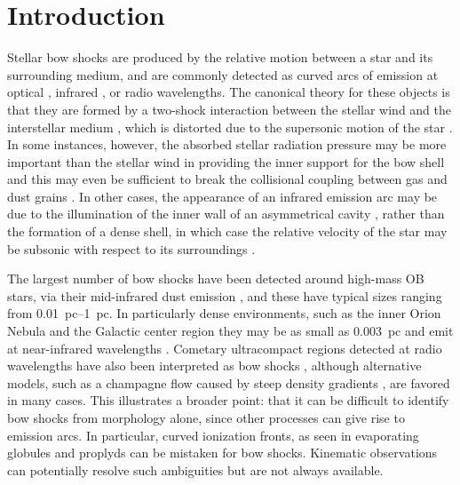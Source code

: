 
\section{Introduction}
\label{sec:introduction}

Stellar bow shocks are produced by the relative motion between a star
and its surrounding medium, and are commonly detected as curved arcs
of emission at optical \citep{Gull:1979a, Brown:2005a}, infrared
\citep{van-Buren:1988a, Kobulnicky:2016a}, or radio
\citep{van-Buren:1990a, Benaglia:2010a} wavelengths.  The canonical
theory for these objects is that they are formed by a two-shock
interaction between the stellar wind and the interstellar medium
\citep{Pikelner:1968a, Dyson:1972a}, which is distorted due to the
supersonic motion of the star \citep{Baranov:1970a, Wilkin:1996a}.  In
some instances, however, the absorbed stellar radiation pressure may
be more important than the stellar wind in providing the inner support
for the bow shell \citep[Paper~I]{Henney:2019a} and this may even be
sufficient to break the collisional coupling between gas and dust
grains \citep[Paper~II]{Henney:2019b}.  In other cases, the appearance
of an infrared emission arc may be due to the illumination of the
inner wall of an asymmetrical cavity \citep{Mackey:2016a}, rather than
the formation of a dense shell, in which case the relative velocity of
the star may be subsonic with respect to its surroundings
\citep{Mackey:2015a}.

The largest number of bow shocks have been detected around high-mass
OB stars, via their mid-infrared dust emission \citep{van-Buren:1995a,
  Noriega-Crespo:1997b, Povich:2008a, Kobulnicky:2010a, Peri:2012a,
  Peri:2015a, Sexton:2015b, Kobulnicky:2016a, Bodensteiner:2018a}, and
these have typical sizes ranging from \SIrange{0.01}{1}{pc}. In
particularly dense environments, such as the inner Orion Nebula
\citep{Smith:2005a} and the Galactic center region
\citep{Geballe:2004a} they may be as small as \SI{0.003}{pc} and emit
at near-infrared wavelengths \citep{Tanner:2005a,
  Sanchez-Bermudez:2014a}.  Cometary ultracompact \hii{} regions
detected at radio wavelengths \citep{Reid:1985a, Wood:1989a,
  Klaassen:2018a} have also been interpreted as bow shocks
\citep{van-Buren:1990a, Mac-Low:1991a}, although alternative models,
such as a champagne flow caused by steep density gradients
\citep{Cyganowski:2003a, Arthur:2006a, Immer:2014a, Steggles:2017a},
are favored in many cases.  This illustrates a broader point: that it
can be difficult to identify bow shocks from morphology alone, since
other processes can give rise to emission arcs.  In particular, curved
ionization fronts, as seen in evaporating globules \citep{Sahai:2012b}
and proplyds \citep{ODell:1993a} can be mistaken for bow shocks.
Kinematic observations can potentially resolve such ambiguities but
are not always available.

